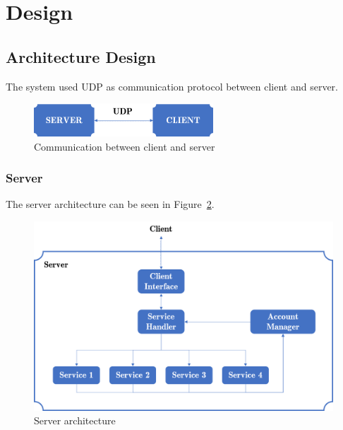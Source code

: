 \documentclass[12pt]{article}
\begin{document}
\pagebreak
\section{Design}

\subsection{Architecture Design}
The system used UDP as communication protocol between client and server.
\begin{figure}[htbp!]
    \centering
    \includegraphics[width=0.6\textwidth]{client-server.png}
    \caption[Client and Server]{Communication between client and server}
    \label{fig:client-server}
\end{figure} 

\subsubsection{Server}
The server architecture can be seen in Figure~\ref{fig:server-architecture}.
\begin{figure}[htbp!]
    \centering
    \includegraphics[width=1.0\textwidth]{server.png}
    \caption[Server Architecture]{Server architecture}
    \label{fig:server-architecture}
\end{figure}
\end{document}
